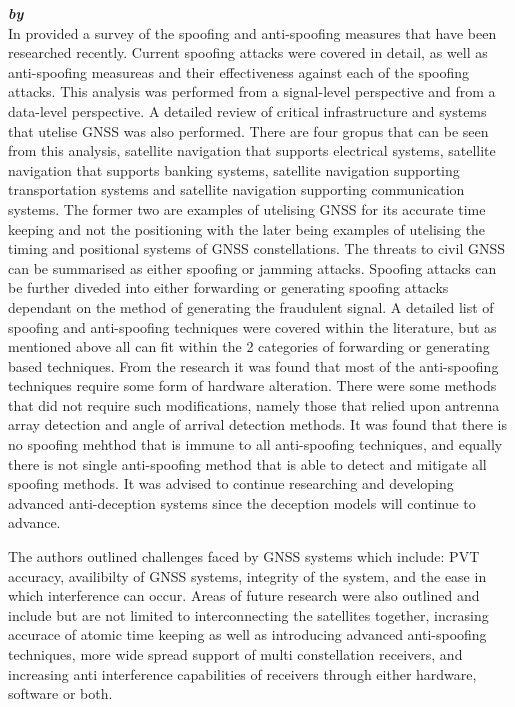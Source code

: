 \textbf{\emph{ by \citeauthor{RN33}}} \\
In \citeyear{RN33} \citeauthor{RN33} provided a survey \cite{RN33} of the spoofing and anti-spoofing measures that have been researched recently. Current spoofing attacks were
covered in detail, as well as anti-spoofing measureas and their effectiveness against each of the spoofing attacks. This analysis was performed from a signal-level
perspective and from a data-level perspective. A detailed review of critical infrastructure and systems that utelise GNSS was also performed. There are four gropus that
can be seen from this analysis, satellite navigation that supports electrical systems, satellite navigation that supports banking systems, satellite navigation supporting
transportation systems and satellite navigation supporting communication systems. The former two are examples of utelising GNSS for its accurate time keeping and not the
positioning with the later being examples of utelising the timing and positional systems of GNSS constellations. The threats to civil GNSS can be summarised as either
spoofing or jamming attacks. Spoofing attacks can be further diveded into either forwarding or generating spoofing attacks dependant on the method of generating the
fraudulent signal. 
A detailed list of spoofing and anti-spoofing techniques were covered within the literature, but as mentioned above all can fit within the 2 categories of forwarding or
generating based techniques.
From the research it was found that most of the anti-spoofing techniques require some form of hardware alteration. There were some methods that did not require such
modifications, namely those that relied upon antrenna array detection and angle of arrival detection methods. It was found that there is no spoofing mehthod that is
immune to all anti-spoofing techniques, and equally there is not single anti-spoofing method that is able to detect and mitigate all spoofing methods. It was advised to
continue researching and developing advanced anti-deception systems since the deception models will continue to advance. 

The authors outlined challenges faced by GNSS systems which include: PVT accuracy, availibilty of GNSS systems, integrity of the system, and the ease in which
interference can occur. Areas of future research were also outlined and include but are not limited to interconnecting the satellites together, incrasing accurace of
atomic time keeping as well as introducing advanced anti-spoofing techniques, more wide spread support of multi constellation receivers, and increasing anti interference
capabilities of receivers through either hardware, software or both.

